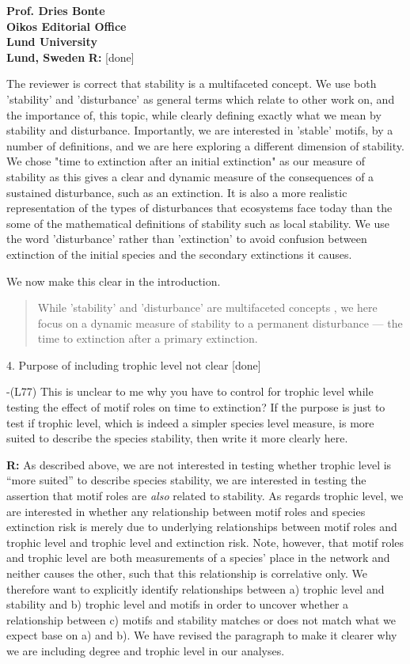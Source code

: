 \documentclass[12pt]{letter}
\begin{document}
\begin{letter}{\bf Prof. Dries Bonte\\
Oikos Editorial Office \\
Lund University \\
Lund, Sweden}
      \textbf{R:} [done]
      
      The reviewer is correct that stability is a multifaceted concept. We use both 'stability' and 'disturbance' as general terms which relate to other work on, and the importance of, this topic, while clearly defining exactly what we mean by stability and disturbance. Importantly, we are interested in 'stable' motifs, by a number of definitions, and we are here exploring a different dimension of stability. We chose "time to extinction after an initial extinction" as our measure of stability as this gives a clear and dynamic measure of the consequences of a sustained disturbance, such as an extinction. It is also a more realistic representation of the types of disturbances that ecosystems face today than the some of the mathematical definitions of stability such as local stability. We use the word 'disturbance' rather than 'extinction' to avoid confusion between extinction of the initial species and the secondary extinctions it causes. 
      
      We now make this clear in the introduction.
      
      \begin{quotation}
	While 'stability' and 'disturbance' are multifaceted concepts \citep{Donohue2013,Radchuck2019}, we here focus on a dynamic measure of stability to a permanent disturbance --- the time to extinction after a primary extinction. 
      \end{quotation}


    4. Purpose of including trophic level not clear [done]

        -(L77) This is unclear to me why you have to control for trophic level while testing the effect of motif roles on time to extinction? If the purpose is just to test if trophic level, which is indeed a simpler species level measure, is more suited to describe the species stability, then write it more clearly here.
        
        \textbf{R:} As described above, we are not interested in testing whether trophic level is ``more suited'' to describe species stability, we are interested in testing the assertion that motif roles are \emph{also} related to stability.
        As regards trophic level, we are interested in whether any relationship between motif roles and species extinction risk is merely due to underlying relationships between motif roles and trophic level and trophic level and extinction risk.
        Note, however, that motif roles and trophic level are both measurements of a species' place in the network and neither causes the other, such that this relationship is correlative only.
        We therefore want to explicitly identify relationships between a) trophic level and stability and b) trophic level and motifs in order to uncover whether a relationship between c) motifs and stability matches or does not match what we expect base on a) and b).
        We have revised the paragraph to make it clearer why we are including degree and trophic level in our analyses.


\end{letter}
\end{document}
